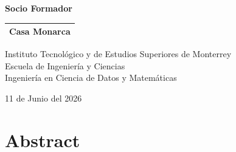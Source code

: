 \documentclass[10pt,letterpaper]{report}
\renewcommand{\_}{\textunderscore\allowbreak}
\begin{document}
\begin{titlepage}
\begin{center}
\vspace{0.5cm}

{\large \textbf{Socio Formador}}

\vspace{0.3cm}

\begin{tabular}{c}
\toprule
Casa Monarca \\
\bottomrule
\end{tabular}

\vspace{0.7cm}

{\large Instituto Tecnol\'ogico y de Estudios Superiores de Monterrey}\\
{\large Escuela de Ingenier\'ia y Ciencias}\\
{\large Ingenier\'ia en Ciencia de Datos y Matem\'aticas}

\vspace{0.5cm}

{\large 11 de Junio del 2026}

\end{center}
\end{titlepage}

\renewcommand{\contentsname}{\'Indice de Contenidos}
\tableofcontents
\clearpage

\renewcommand{\listtablename}{\'Indice de Tablas}
\listoftables
\clearpage

\renewcommand{\listfigurename}{\'Indice de Figuras}
\listoffigures
\clearpage

\chapter*{Abstract}
\end{document}
